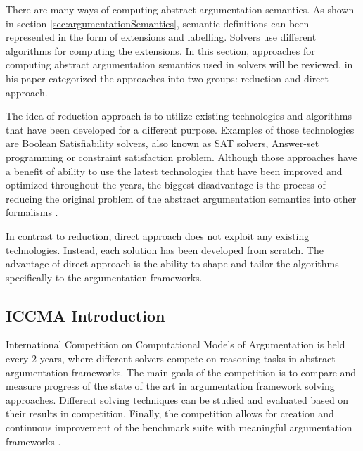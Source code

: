 There are many ways of computing abstract argumentation semantics. As shown in section \ref{sec:argumentationSemantics}, semantic definitions can been represented in the form of extensions and labelling. Solvers use different algorithms for computing the extensions. In this section, approaches for computing abstract argumentation semantics used in solvers will be reviewed. \citet{solvingMethods} in his paper categorized the approaches into two groups: reduction and direct approach.

The idea of reduction approach is to utilize existing technologies and algorithms that have been developed for a different purpose. Examples of those technologies are Boolean Satisfiability solvers, also known as SAT solvers, Answer-set programming or constraint satisfaction problem. Although those approaches have a benefit of ability to use the latest technologies that have been improved and optimized throughout the years, the biggest disadvantage is the process of reducing the original problem of the abstract argumentation semantics into other formalisms \citep{solvingMethods}.

In contrast to reduction, direct approach does not exploit any existing technologies. Instead, each solution has been developed from scratch. The advantage of direct approach is the ability to shape and tailor the algorithms specifically to the argumentation frameworks.

\subsection{ICCMA Introduction}

International Competition on Computational Models of Argumentation is held every 2 years, where different solvers compete on reasoning tasks in abstract argumentation frameworks. The main goals of the competition is to compare and measure progress of the state of the art in argumentation framework solving approaches. Different solving techniques can be studied and evaluated based on their results in competition. Finally, the competition allows for creation and continuous improvement of the benchmark suite with meaningful argumentation frameworks \citep{results_sildes}.

